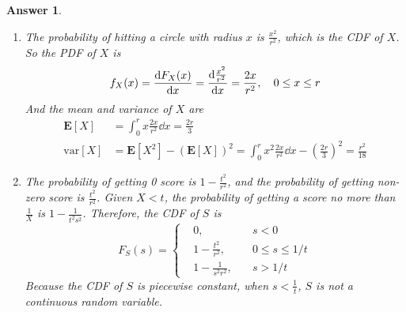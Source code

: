 \documentclass[utf8]{article}
\theoremstyle{definition}%
\theoremstyle{plain}%
\newtheorem{answer}{Answer} %
\begin{document}
\begin{answer} ~
    \begin{enumerate}[label=(\alph*)]
        \item The probability of hitting a circle with radius $x$ is $\frac{x^2}{r^2}$, which is the CDF of $X$. So the PDF of $X$ is
        \begin{equation}
            f_{X}(x) = \dv{F_{X}(x)}{x} = \dv{\frac{x^2}{r^2}}{x} = \frac{2x}{r^2}, \quad 0 \leq x \leq r
        \end{equation}
        And the mean and variance of $X$ are
        \begin{align}
            \mathbf{E}[X] &= \int_{0}^{r} x\frac{2x}{r^2} \dd{x} = \frac{2r}{3} \\ 
            \text{var}[X] &= \mathbf{E}[X^2] - (\mathbf{E}[X])^2 = \int_{0}^{r} x^2\frac{2x}{r^2} \dd{x} - \left(\frac{2r}{3}\right)^2 = \frac{r^2}{18}
        \end{align}
        \item The probability of getting 0 score is $1 - \frac{t^2}{r^2}$, and the probability of getting non-zero score is $\frac{t^2}{r^2}$. Given $X < t$, the probability of getting a score no more than $\frac{1}{X}$ is $1 - \frac{1}{t^2s^2}$. Therefore, the CDF of $S$ is
        \begin{equation}
            F_{S}(s) = \left\{\begin{aligned}
                &0, \quad &s < 0 \\
                &1 - \frac{t^2}{r^2}, \quad &0 \leq s \leq 1/t \\ 
                &1 - \frac{1}{s^2r^2}, \quad &s > 1/t
            \end{aligned}\right.
        \end{equation}
        Because the CDF of $S$ is piecewise constant, when $s < \frac{1}{t}$, $S$ is not a continuous random variable.
    \end{enumerate}
\end{answer}
\end{document}
